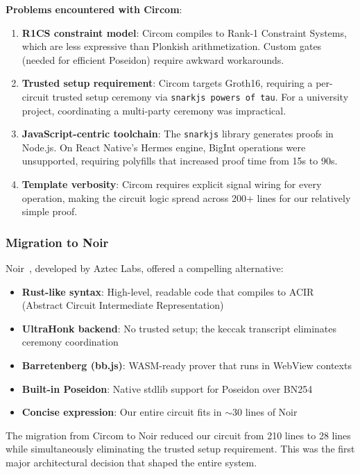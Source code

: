 \textbf{Problems encountered with Circom}:
\begin{enumerate}
    \item \textbf{R1CS constraint model}: Circom compiles to Rank-1 Constraint Systems, which are less expressive than Plonkish arithmetization. Custom gates (needed for efficient Poseidon) require awkward workarounds.
    \item \textbf{Trusted setup requirement}: Circom targets Groth16, requiring a per-circuit trusted setup ceremony via \texttt{snarkjs powers of tau}. For a university project, coordinating a multi-party ceremony was impractical.
    \item \textbf{JavaScript-centric toolchain}: The \texttt{snarkjs} library generates proofs in Node.js. On React Native's Hermes engine, BigInt operations were unsupported, requiring polyfills that increased proof time from 15s to 90s.
    \item \textbf{Template verbosity}: Circom requires explicit signal wiring for every operation, making the circuit logic spread across 200+ lines for our relatively simple proof.
\end{enumerate}

\subsubsection{Migration to Noir}

Noir~\cite{aztec2024noir}, developed by Aztec Labs, offered a compelling alternative:
\begin{itemize}
    \item \textbf{Rust-like syntax}: High-level, readable code that compiles to ACIR (Abstract Circuit Intermediate Representation)
    \item \textbf{UltraHonk backend}: No trusted setup; the keccak transcript eliminates ceremony coordination
    \item \textbf{Barretenberg (bb.js)}: WASM-ready prover that runs in WebView contexts
    \item \textbf{Built-in Poseidon}: Native stdlib support for Poseidon over BN254
    \item \textbf{Concise expression}: Our entire circuit fits in $\sim$30 lines of Noir
\end{itemize}

The migration from Circom to Noir reduced our circuit from 210 lines to 28 lines while simultaneously eliminating the trusted setup requirement. This was the first major architectural decision that shaped the entire system.

